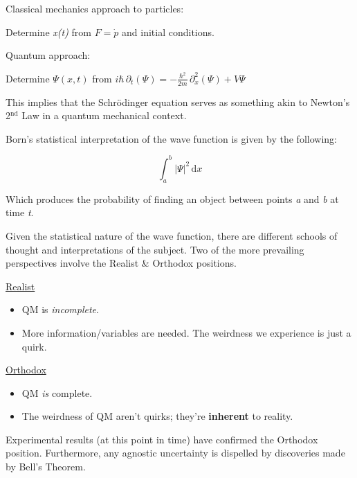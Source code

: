 Classical mechanics approach to particles:

Determine \textit{x(t)} from $F = \dot{p}$ and initial conditions.

\bigskip \bigskip

Quantum approach:

Determine $\Psi(x,t)$ from $i\hbar \, \partial_{t}(\Psi) =
- \frac{\hbar^{2}}{2m} \, \partial_{x}^{2}(\Psi)
+ V\Psi$

\bigskip

This implies that the Schrödinger equation serves as something akin to
Newton's 2$^{\text{nd}}$ Law in a quantum mechanical context.

\bigskip \bigskip

Born's statistical interpretation of the wave function is given by the
following:

\[
    \int_{a}^{b} |\Psi|^{2} \, \text{d}x
\]

Which produces the probability of finding an object between points
\textit{a} and \textit{b} at time \textit{t}.

\bigskip \bigskip

Given the statistical nature of the wave function, there are different schools
of thought and interpretations of the subject. Two of the more prevailing
perspectives involve the Realist \& Orthodox positions.

\bigskip

\underline{Realist}
\begin{itemize}[leftmargin = 0.5in]
    \item QM is \textit{incomplete}.
    \item More information/variables are needed. The weirdness we experience
          is just a quirk.
\end{itemize}

\bigskip

\underline{Orthodox}
\begin{itemize}[leftmargin = 0.5in]
    \item QM \textit{is} complete.
    \item The weirdness of QM aren't quirks; they're \textbf{inherent} to
          reality.
\end{itemize}

\bigskip

Experimental results (at this point in time) have confirmed the Orthodox
position. Furthermore, any agnostic uncertainty is dispelled by discoveries
made by Bell's Theorem.

\newpage